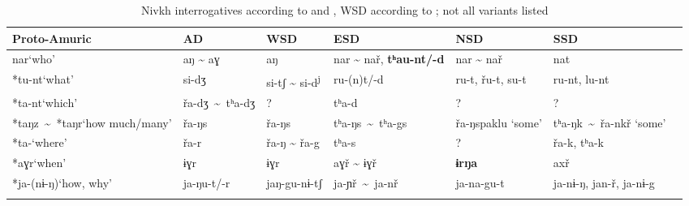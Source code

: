 \begin{table}
\caption{Nivkh interrogatives according to \citet[14]{Mattissen2003} and \citet[passim]{Fortescue2016}, WSD according to \citet[206]{ShiraishiTangiku2013}; not all variants listed}
\label{tab:amur:2}
\small
\begin{tabularx}{\textwidth}{>{\raggedright}p{1.7cm}llQQQQ}
\lsptoprule
\textbf{Proto-Amuric} & \textbf{AD} & \textbf{WSD} & \textbf{ESD} & \textbf{NSD} & \textbf{SSD}\\
\midrule
*nar\newline ‘who’ & aŋ {\textasciitilde} aɣ & aŋ & nar {\textasciitilde} nař, \textbf{tʰ}\textbf{au-nt/-d} & nar {\textasciitilde} nař & nat\\
\tablevspace 
*tu-nt\newline ‘what’ & si-dʒ & si-tʃ {\textasciitilde} si-d\textsuperscript{j} & ru-(n)t/-d & ru-t, řu-t, su-t & ru-nt, lu-nt\\
\tablevspace 
*ta-nt\newline ‘which’ & \mbox{řa-dʒ {\textasciitilde} tʰa-dʒ} & ?\footnotemark & tʰa-d & ? & ?\\
\tablevspace 
\mbox{*taŋz {\textasciitilde} *taŋr}\newline ‘how much/many’ & řa-ŋs & řa-ŋs & \mbox{tʰa-ŋs {\textasciitilde} tʰa-gs} & řa-ŋspaklu ‘some’ & \mbox{tʰa-ŋk {\textasciitilde} řa-nkř} ‘some’\\
\tablevspace 
*ta-\newline ‘where’ & řa-r & řa-ŋ {\textasciitilde} řa-g & tʰa-s & ? & řa-k, tʰa-k\\
\tablevspace 
*aɣr\newline ‘when’ & ɨɣr & ɨɣr & aɣř {\textasciitilde} ɨɣř & \textbf{ɨrŋa} & axř\\
\tablevspace 
*ja-(nɨ-ŋ)\newline ‘how, why’ & ja-ŋu-t/-r & jaŋ-gu-nɨ-tʃ & \mbox{ja-ɲř {\textasciitilde} ja-nř} & ja-na-gu-t & ja-nɨ-ŋ, jan-ř, ja-nɨ-g\\
\lspbottomrule
\end{tabularx}
\end{table}


